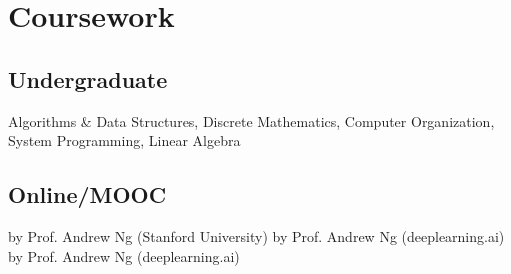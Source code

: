 
\section{Coursework}
\subsection{Undergraduate}
Algorithms \& Data Structures,
Discrete Mathematics,
Computer Organization,
System Programming,
Linear Algebra
\sectionsep

\subsection{Online/MOOC}
 by Prof. Andrew Ng (Stanford University)
 by Prof. Andrew Ng (deeplearning.ai)
 by Prof. Andrew Ng (deeplearning.ai)
\sectionsep

